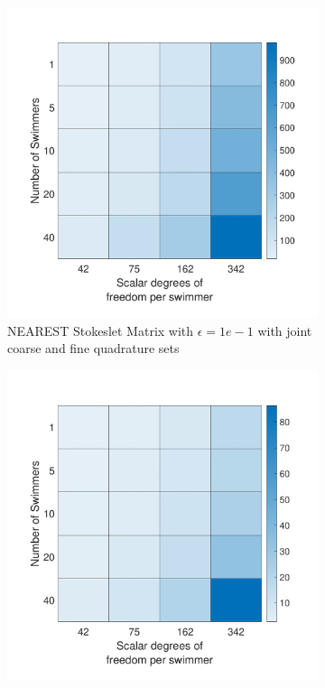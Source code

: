 \begin{figure}
\ContinuedFloat
    \begin{subfigure}{0.3\textwidth}
        \includegraphics[width=\linewidth]{Images/Condition/Stokeslet Matrix using Contained NEAREST-1.pdf}
        \caption{NEAREST Stokeslet Matrix with $\epsilon=1e-1$ with joint coarse and fine quadrature sets}
    \end{subfigure}
    \begin{subfigure}{0.3\textwidth}
        \includegraphics[width=\linewidth]{Images/Condition/Stokeslet Matrix using Contained NEAREST-2.pdf}

\end{subfigure}
\end{figure}
